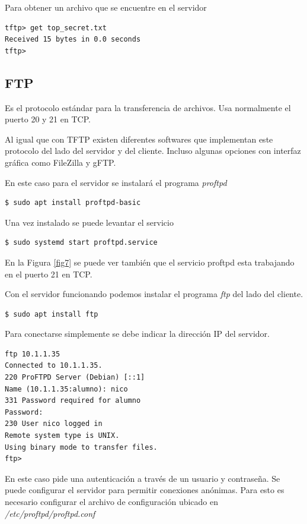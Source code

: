\documentclass[12pt]{article}
\begin{document}
Para obtener un archivo que se encuentre en el servidor
\begin{lstlisting}[frame=single]
tftp> get top_secret.txt
Received 15 bytes in 0.0 seconds
tftp>
\end{lstlisting}

\subsection{FTP}

Es el protocolo estándar para la transferencia de archivos. Usa normalmente el puerto 20 y 21 en TCP.

Al igual que con TFTP existen diferentes softwares que implementan este protocolo del lado del servidor y del cliente. Incluso algunas opciones con interfaz gráfica como FileZilla y gFTP. 

En este caso para el servidor se instalará el programa \emph{proftpd}

\begin{lstlisting}[frame=single]
$ sudo apt install proftpd-basic
\end{lstlisting}

Una vez instalado se puede levantar el servicio
\begin{lstlisting}[frame=single]
$ sudo systemd start proftpd.service
\end{lstlisting}

En la Figura \ref{fig7} se puede ver también que el servicio proftpd esta trabajando en el puerto 21 en TCP. 

Con el servidor funcionando podemos instalar el programa \emph{ftp} del lado del cliente.

\begin{lstlisting}[frame=single]
$ sudo apt install ftp
\end{lstlisting}

Para conectarse simplemente se debe indicar la dirección IP del servidor.
\begin{lstlisting}[frame=single]
ftp 10.1.1.35
Connected to 10.1.1.35.
220 ProFTPD Server (Debian) [::1]
Name (10.1.1.35:alumno): nico
331 Password required for alumno
Password:
230 User nico logged in
Remote system type is UNIX.
Using binary mode to transfer files.
ftp>
\end{lstlisting}

En este caso pide una autenticación a través de un usuario y contraseña. Se puede configurar el servidor para permitir conexiones anónimas. Para esto es necesario configurar el archivo de configuración ubicado en \emph{/etc/proftpd/proftpd.conf}
\end{document}
